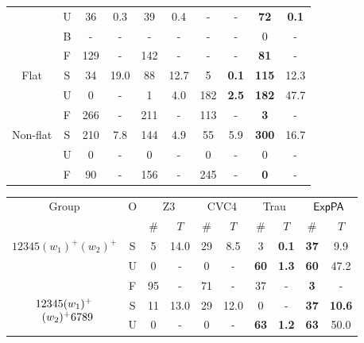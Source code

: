 \begin{table*}[t]
{\begin{tabular}{ c c c c c c c c c c }
         & U & 36 & 0.3 & 39 & 0.4 & - & - &  {\bf 72} & {\bf 0.1} \\
         \cline{2-10}
         & B & -  & -  & - & - & - & - &  0 & - \\
         \cline{2-10}
         & F & 129 & - & 142 & - & - & - &  {\bf 81} & -\\
         \hline
         \cline{1-10}
        \multirow{3}{*}{\scriptsize{Flat}} 
         & S & 34 & 19.0 & 88 & 12.7 & 5 & {\bf 0.1}& {\bf 115}  & 12.3\\
        \cline{2-10}
         & U & 0 & - & 1 & 4.0 & 182 & {\bf 2.5} & {\bf 182} & 47.7 \\
         \cline{2-10}
         & F & 266 & - & 211 & - & 113 & - & {\bf 3} & - \\ 
         \cline{1-10}
        \multirow{3}{*}{\scriptsize{Non-flat}}
         & S & 210 & 7.8 & 144 & 4.9 & 55 & 5.9 &{\bf 300} & 16.7 \\
        \cline{2-10}
         & U & 0 & - & 0 & - & 0 & - & 0 & - \\
         \cline{2-10}
         & F & 90 & - & 156 & - & 245 & - & {\bf 0} & - \\ 
         \cline{1-10}
        \end{tabular}
    }
    \resizebox{5.5cm}{!}
    {
    \begin{tabular}{cccccccccc}
    \hline
        \multirow{2}{*}{Group }  & \multirow{2}{*}{O} & \multicolumn{2}{c}{Z3} & \multicolumn{2}{c}{CVC4} &  \multicolumn{2}{c}{Trau} & \multicolumn{2}{c}{${\sf ExpPA}$} \\
       &  & $\#$ & $T$ &  $\#$ & $T$ & $\#$ & $T$ &  $\#$ & $T$ \\ 
       \hline
       \cline{1-10}
       \multirow{3}{*}{\scriptsize{$12345(w_1)^+(w_2)^+$}} & S & 5 & 14.0 & 29 & 8.5 & 3 & {\bf  0.1} & {\bf 37} & 9.9 \\
         \cline{2-10}
        & U & 0 & - & 0 & - & {\bf 60} & {\bf 1.3} & {\bf 60} & 47.2 \\
         \cline{2-10}
        & F & 95 & - & 71 & - & 37 & - & {\bf 3} & - \\ 
        \cline{1-10}
       \multirow{3}{*}{\scriptsize{$\begin{array}{l}12345(w_1)^+ \\
       \hspace{2mm}(w_2)^+6789\end{array}$}} & S & 11 & 13.0 & 29 & 12.0 & 0 & - & {\bf 37} & {\bf 10.6} \\
        \cline{2-10}
        & U & 0 & - & 0 & - & {\bf 63} & {\bf 1.2} & {\bf 63} & 50.0 \\

\end{tabular}}
\end{table*}
